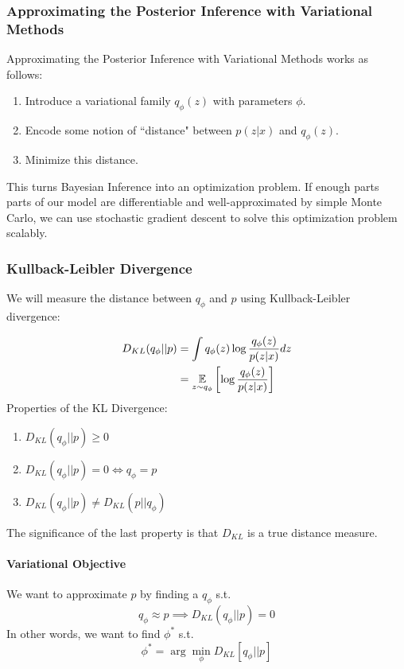 \documentclass[11pt]{article}
\begin{document}
\subsubsection{Approximating the Posterior Inference with Variational Methods}
Approximating the Posterior Inference with Variational Methods works as follows:
\begin{enumerate}
	\item Introduce a variational family $q_\phi(z)$ with parameters $\phi$.
	\item Encode some notion of 	``distance" between $p(z|x)$ and $q_\phi(z)$.
	\item Minimize this distance.
\end{enumerate}

\remark
This turns Bayesian Inference into an optimization problem. If enough parts parts of our model are differentiable and well-approximated by simple Monte Carlo, we can use stochastic gradient descent to solve this optimization problem scalably.

\subsubsection{Kullback-Leibler Divergence}
We will measure the distance between $q_\phi$ and $p$ using Kullback-Leibler divergence:

\begin{align*}
	D_{KL}(q_\phi||p) &= \int q_\phi(z) \log \frac{q_\phi(z)}{p(z|x)} dz\\
	&= \underset{z \sim q_\phi}{\mathbb{E}}\left[ \log \frac{q_\phi(z)}{p(z|x)} \right]
\end{align*}
\property
Properties of the KL Divergence:
\begin{enumerate}
	\item $D_{KL}(q_\phi ||p) \geq 0$
	\item $D_{KL}(q_\phi ||p) = 0 \iff q_\phi = p$
	\item $D_{KL}(q_\phi ||p) \neq D_{KL}(p||q_\phi)$
\end{enumerate}

\remark
The significance of the last property is that $D_{KL}$ is  a true distance measure.

\paragraph{Variational Objective}
We want to approximate $p$ by finding a $q_\phi$ s.t.
$$q_\phi \approx p \implies D_{KL}(q_\phi || p) = 0$$
In other words, we want to find $\phi^*$ s.t. 
$$\phi^* = \arg \min_\phi D_{KL}[q_\phi || p]$$
\remark
{}
\end{document}
